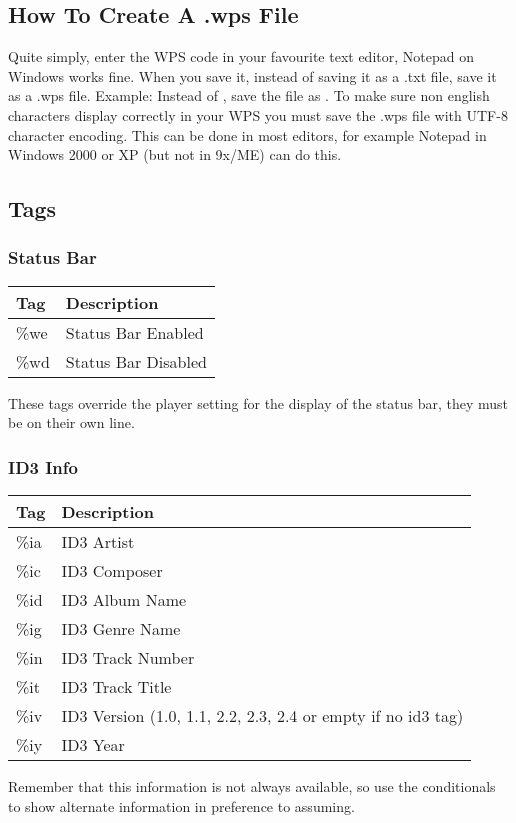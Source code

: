 \subsection{How To Create A .wps File}
Quite simply, enter the WPS code in your favourite text editor, Notepad on Windows works fine. When you save it, instead of saving it as a .txt file, save it as a .wps file. Example: Instead of , save the file as . To make sure non english characters display correctly in your WPS you must save the .wps file with UTF-8 character encoding. This can be done in most editors, for example Notepad in Windows 2000 or XP (but not in 9x/ME) can do this.

\subsection{Tags}

\subsubsection{Status Bar}
\begin{center}
  \begin{tabular}{@{}ll@{}}\toprule
    \textbf{Tag} & \textbf{Description}\\\midrule
    \%we & Status Bar Enabled\\
    \%wd & Status Bar Disabled\\\bottomrule
  \end{tabular}
\end{center}
These tags override the player setting for the display of the status bar, they must be on their own line.

\subsubsection{ID3 Info}

\begin{center}
  \begin{tabular}{@{}ll@{}}\toprule
    \textbf{Tag} & \textbf{Description}\\\midrule
    \%ia & ID3 Artist\\
    \%ic & ID3 Composer\\
    \%id & ID3 Album Name\\
    \%ig & ID3 Genre Name\\
    \%in & ID3 Track Number\\
    \%it & ID3 Track Title\\
    \%iv & ID3 Version (1.0, 1.1, 2.2, 2.3, 2.4 or empty if no id3 tag)\\
    \%iy & ID3 Year\\\bottomrule
  \end{tabular}
\end{center}
Remember that this information is not always available, so use the conditionals to show alternate information in preference to assuming.

